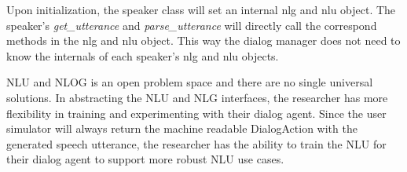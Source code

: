 Upon initialization, the speaker class will set an internal nlg and nlu object. The speaker's\textit{ get\_utterance } and \textit{parse\_utterance} will directly call the correspond methods in the nlg and nlu object. This way the dialog manager does not need to know the internals of each speaker's nlg and nlu objects. 

NLU and NLOG is an open problem space and there are no single universal solutions. In abstracting the NLU and NLG interfaces, the researcher has more flexibility in training and experimenting with their dialog agent. Since the user simulator will always return the machine readable DialogAction with the generated speech utterance, the researcher has the ability to train the NLU for their dialog agent to support more robust NLU use cases. 







